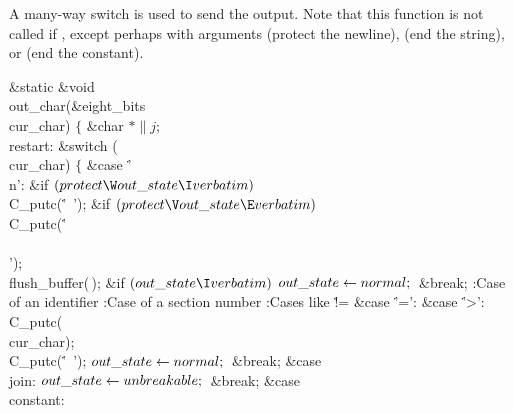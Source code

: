 A many-way switch is used to send the output.  Note that this function
is not called if , except perhaps with
arguments
 (protect the newline),  (end the string), or 
(end the constant).

\Y\B\1\1\&{static} \&{void} \\{out\_char}(\&{eight\_bits} \\{cur\_char})\2\2\6
${}\{{}$\1\6
\&{char} ${}{*}\|j{}$;\7
\4\\{restart}:\6
\&{switch} (\\{cur\_char})\5
${}\{{}$\1\6
\4\&{case} \.{'\\n'}:\6
\&{if} ${}(\\{protect}\W\\{out\_state}\I\\{verbatim}){}$\1\5
\\{C\_putc}(\.{'\ '});\2\6
\&{if} ${}(\\{protect}\V\\{out\_state}\E\\{verbatim}){}$\1\5
\\{C\_putc}(\.{'\\\\'});\2\6
\\{flush\_buffer}(\,);\6
\&{if} ${}(\\{out\_state}\I\\{verbatim}){}$\1\5
${}\\{out\_state}\leftarrow\\{normal};{}$\2\6
\&{break};\6
\hbox{\4}:Case of an identifier\X\6
\hbox{\4}:Case of a section number\X\6
\hbox{\4}:Cases like \.{!=}\X\6
\4\&{case} \.{'='}:\5
\&{case} \.{'>'}:\5
\\{C\_putc}(\\{cur\_char});\5
\\{C\_putc}(\.{'\ '});\6
${}\\{out\_state}\leftarrow\\{normal};{}$\6
\&{break};\6
\4\&{case} \\{join}:\5
${}\\{out\_state}\leftarrow\\{unbreakable};{}$\6
\&{break};\6
\4\&{case} \\{constant}:\6
